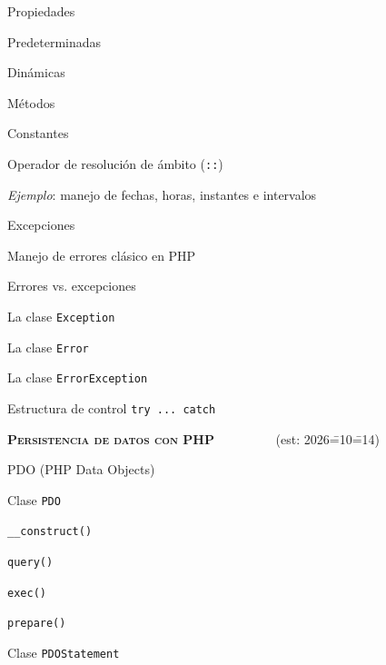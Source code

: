 \begin{longenum}
\begin{longenum}
        \item Propiedades
        \begin{longenum}
            \item Predeterminadas
            \item Dinámicas
        \end{longenum}
        \item Métodos
        \item Constantes
        \begin{longenum}
            \item Operador de resolución de ámbito (\texttt{::})
        \end{longenum}
        \item \textit{Ejemplo}: manejo de fechas, horas, instantes e intervalos
        \item Excepciones
        \begin{longenum}
            \item Manejo de errores clásico en PHP
            \item Errores vs. excepciones
            \item La clase \texttt{Exception}
            \item La clase \texttt{Error}
            \item La clase \texttt{ErrorException}
            \item Estructura de control \texttt{try ... catch}
        \end{longenum}
    \end{longenum}
    \item \textbf{\textsc{Persistencia de datos con PHP}} \ \ \ \ \ \ \ \ \ (est: 2026\==10\==14)
    \begin{longenum}
        \item PDO (PHP Data Objects)
        \begin{longenum}
            \item Clase \texttt{PDO}
            \begin{longenum}
                \item \texttt{\_\_construct()}
                \item \texttt{query()}
                \item \texttt{exec()}
                \item \texttt{prepare()}
            \end{longenum}
            \item Clase \texttt{PDOStatement}

\end{longenum}
\end{longenum}
\end{longenum}
